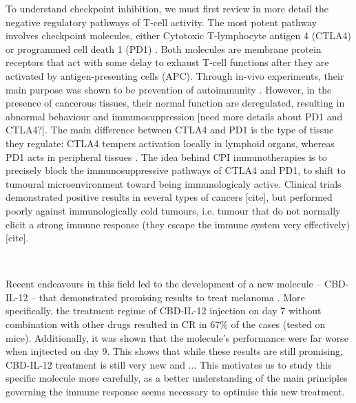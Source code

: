\documentclass[11pt]{article}
\begin{document}
\par To understand checkpoint inhibition, we must first review in more detail the negative regulatory pathways of T-cell activity. The most potent pathway involves checkpoint molecules, either Cytotoxic T-lymphocyte antigen 4 (CTLA4) or programmed cell death 1 (PD1) \cite{cpiProof}. Both molecules are membrane protein receptors that act with some delay to exhaust T-cell functions after they are activated by antigen-presenting cells (APC). Through in-vivo experiments, their main purpose was shown to be prevention of autoimmunity \cite{PD1Autoimmune}. However, in the presence of cancerous tissues, their normal function are deregulated, resulting in abnormal behaviour and immunosuppression [need more details about PD1 and CTLA4?]. The main difference between CTLA4 and PD1 is the type of tissue they regulate: CTLA4 tempers activation locally in lymphoid organs, whereas PD1 acts in peripheral tissues \cite{PDvsCTLA}. The idea behind CPI immunotherapies is to precisely block the immunosuppressive pathways of CTLA4 and PD1, to shift to tumoural microenvironment toward being immunologicaly active. Clinical trials demonstrated positive results in several types of cancers [cite], but performed poorly against immunologically cold tumours, i.e. tumour that do not normally elicit a strong immune response (they escape the immune system very effectively) [cite].  


~
\par Recent endeavours in this field led to the development of a new molecule -- CBD-IL-12 -- that demonstrated promising results to treat melanoma \cite{cbdil12}. More specifically, the treatment regime of CBD-IL-12 injection on day 7 without combination with other drugs resulted in CR in 67\% of the cases (tested on mice). Additionally, it was shown that the molecule's performance were far worse when injtected on day 9. This shows that while these results are still promising, CBD-IL-12 treatment is still very new and ... This motivates us to study this specific molecule more carefully, as a better understanding of the main principles governing the immune response seems necessary to optimise this new treatment.
\end{document}
